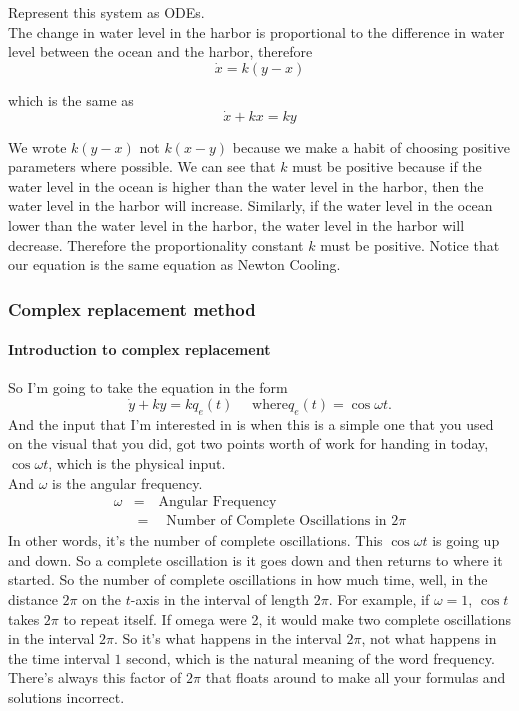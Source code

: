 Represent this system as ODEs.\\

The change in water level in the harbor is proportional to the difference in water level between the ocean
and the harbor, therefore
\begin{equation*}
  \dot{x} = k(y - x)
\end{equation*}

which is the same as
\begin{equation*}
  \dot{x} + kx = ky 
\end{equation*}

We wrote $k(y−x)$ not $k(x−y)$ because we make a habit of choosing positive parameters where possible.
We can see that $k$ must be positive because
if the water level in the ocean is higher than the water level in the harbor,
then the water level in the harbor will increase.
Similarly, if the water level in the ocean lower than the water level in the harbor,
the water level in the harbor will decrease.
Therefore the proportionality constant $k$ must be positive.
Notice that our equation is the same equation as Newton Cooling.
\clearpage
\subsubsection{Complex replacement method}

\paragraph{Introduction to complex replacement}
So I'm going to take the equation in the form
\begin{equation*}
  \dot{y} + ky = kq _e (t) \quad \text{ where} q _e(t) = \cos \omega t. 
\end{equation*}
And the input that I'm interested in is when this
is a simple one that you used on the visual that you did,
got two points worth of work for handing in today, $\cos \omega t$,
which is the physical input. \\

And $\omega$ is the angular frequency.
\begin{align*}
  \omega &= \quad \text{Angular Frequency} \\
         &= \quad \text{Number of Complete Oscillations in } 2 \pi
\end{align*}
In other words, it's the number of complete oscillations.
This $\cos \omega t$ is going up and down.
So a complete oscillation is it goes down and then returns to where it started.
So the number of complete oscillations in how much time, well, in the distance $2 \pi$
on the $t$-axis in the interval of length $2 \pi$.
For example, if $\omega = 1$, $\cos t$ takes $2 \pi$ to repeat itself.
If omega were 2, it would make two complete oscillations in the interval $2 \pi$.
So it's what happens in the interval $2 \pi$, not what happens in the time interval $1$ second,
which is the natural meaning of the word frequency.
There's always this factor of $2 \pi$ that floats around to make all your formulas
and solutions incorrect.\\

